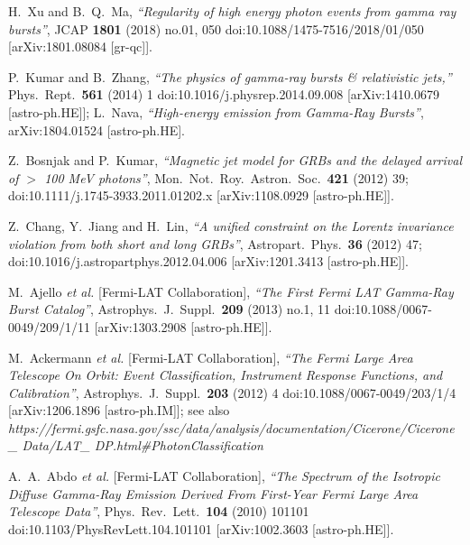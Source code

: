 \documentclass[12pt]{article}
\begin{document}
{\begin{thebibliography}{99}
  H.~Xu and B.~Q.~Ma,
  {\it ``Regularity of high energy photon events from gamma ray bursts''},
  JCAP {\bf 1801} (2018) no.01,  050
  doi:10.1088/1475-7516/2018/01/050
  [arXiv:1801.08084 [gr-qc]].

 P.~Kumar and B.~Zhang,
  {\it ``The physics of gamma-ray bursts \& relativistic jets,''}
  Phys.\ Rept.\  {\bf 561} (2014) 1
  doi:10.1016/j.physrep.2014.09.008
  [arXiv:1410.0679 [astro-ph.HE]];
 L.~Nava, {\it ``High-energy emission from Gamma-Ray Bursts''},
  arXiv:1804.01524 [astro-ph.HE].

 Z.~Bosnjak and P.~Kumar,
  {\it ``Magnetic jet model for GRBs and the delayed arrival of  $>$ 100 MeV photons''},
  Mon.\ Not.\ Roy.\ Astron.\ Soc.\  {\bf 421} (2012) 39;
  doi:10.1111/j.1745-3933.2011.01202.x
  [arXiv:1108.0929 [astro-ph.HE]].

  Z.~Chang, Y.~Jiang and H.~Lin,
  {\it ``A unified constraint on the Lorentz invariance violation from both short and long GRBs''},
  Astropart.\ Phys.\  {\bf 36} (2012) 47;
  doi:10.1016/j.astropartphys.2012.04.006
  [arXiv:1201.3413 [astro-ph.HE]].

 M.~Ajello {\it et al.} [Fermi-LAT Collaboration],
  {\it ``The First Fermi LAT Gamma-Ray Burst Catalog''},
  Astrophys.\ J.\ Suppl.\  {\bf 209} (2013) no.1,  11
  doi:10.1088/0067-0049/209/1/11
  [arXiv:1303.2908 [astro-ph.HE]].

 M.~Ackermann {\it et al.} [Fermi-LAT Collaboration],
  {\it ``The Fermi Large Area Telescope On Orbit: Event Classification, Instrument Response Functions, and Calibration''},
  Astrophys.\ J.\ Suppl.\  {\bf 203} (2012) 4
  doi:10.1088/0067-0049/203/1/4
  [arXiv:1206.1896 [astro-ph.IM]];
  see also {\it https://fermi.gsfc.nasa.gov/ssc/data/analysis/documentation/Cicerone/Cicerone\_ Data/LAT\_ DP.html\#PhotonClassification}

 A.~A.~Abdo {\it et al.} [Fermi-LAT Collaboration],
  {\it ``The Spectrum of the Isotropic Diffuse Gamma-Ray Emission Derived From First-Year Fermi Large Area Telescope Data''},
  Phys.\ Rev.\ Lett.\  {\bf 104} (2010) 101101
  doi:10.1103/PhysRevLett.104.101101
  [arXiv:1002.3603 [astro-ph.HE]].


\end{thebibliography}}
\end{document}
